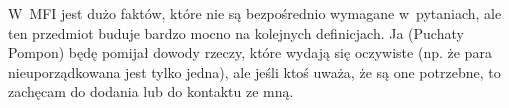 W~MFI jest dużo faktów, które nie są bezpośrednio wymagane w~pytaniach, ale ten przedmiot buduje bardzo mocno na kolejnych definicjach. Ja (Puchaty Pompon) będę pomijał dowody rzeczy, które wydają się oczywiste (np. że para nieuporządkowana jest tylko jedna), ale jeśli ktoś uważa, że są one potrzebne, to zachęcam do dodania lub do kontaktu ze mną.